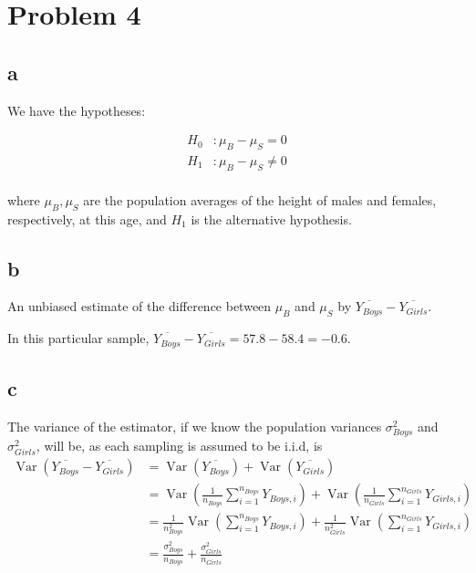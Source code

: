 \documentclass[12pt,letterpaper]{article}
\theoremstyle{definition}
\DeclareMathOperator{\Var}{Var}
\begin{document}
\section*{Problem 4}

\subsection*{a}

We have the hypotheses:

\begin{align*}
  H_{0}&: \mu_{B} - \mu_{S} = 0 \\
  H_{1}&: \mu_{B} - \mu_{S} \neq 0\\
\end{align*}

where $\mu_{B}, \mu_{S}$ are the population averages of the height of males and females, respectively, at this age, and $H_{1}$ is the alternative hypothesis.

\subsection*{b}

An unbiased estimate of the difference between $\mu_{B}$ and $\mu_{S}$ by $\overline{Y_{Boys}} - \overline{Y_{Girls}}$.

In this particular sample, $\overline{Y_{Boys}} - \overline{Y_{Girls}} = 57.8 - 58.4 = -0.6$.

\subsection*{c}

The variance of the estimator, if we know the population variances $\sigma^{2}_{Boys}$ and $\sigma^{2}_{Girls}$, will be, as each sampling is assumed to be i.i.d, is
\begin{align*}
  \Var(\overline{Y_{Boys}} - \overline{Y_{Girls}}) &= \Var(\overline{Y_{Boys}}) + \Var(\overline{Y_{Girls}}) \\
                                                   &= \Var\left(\frac{1}{n_{Boys}}\sum_{i=1}^{n_{Boys}} Y_{Boys,i}\right) + \Var\left(\frac{1}{n_{Girls}}\sum_{i=1}^{n_{Girls}} Y_{Girls,i}\right) \\
                                                   &= \frac{1}{n_{Boys}^{2}}\Var\left(\sum_{i=1}^{n_{Boys}} Y_{Boys,i}\right) + \frac{1}{n_{Girls}^{2}}\Var\left(\sum_{i=1}^{n_{Girls}} Y_{Girls,i}\right) \\
  &= \frac{\sigma^{2}_{Boys}}{n_{Boys}} + \frac{\sigma^{2}_{Girls}}{n_{Girls}}
\end{align*}
\end{document}
